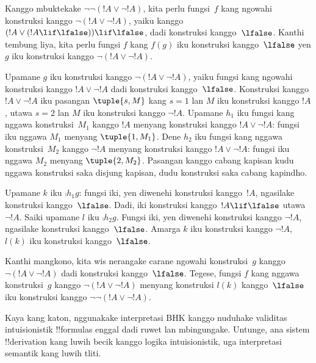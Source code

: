 \documentclass[../../../include/open-logic-section]{subfiles}
\begin{document}
\begin{ex}
Kanggo mbuktekake $\lnot \lnot (!A \lor \lnot !A)$, kita perlu
fungsi~$f$ kang ngowahi konstruksi kanggo $\lnot(!A \lor \lnot !A)$,
yaiku kanggo $(!A
\lor (!A \lif \lfalse)) \lif \lfalse$, dadi konstruksi
kanggo~$\lfalse$. Kanthi tembung liya, kita perlu fungsi $f$ kang
$f(g)$ iku konstruksi kanggo~$\lfalse$ yen $g$ iku konstruksi kanggo
$\lnot(!A
\lor \lnot !A)$.

Upamane $g$ iku konstruksi kanggo $\lnot(!A \lor \lnot !A)$, yaiku
fungsi kang ngowahi konstruksi kanggo $!A \lor \lnot !A$ dadi
konstruksi kanggo~$\lfalse$. Konstruksi kanggo $!A \lor \lnot !A$
iku pasangan $\tuple{s, M}$ kang $s = 1$ lan $M$ iku konstruksi kanggo
$!A$, utawa $s = 2$ lan $M$ iku konstruksi kanggo $\lnot !A$.
Upamane $h_1$ iku fungsi kang nggawa konstruksi~$M_1$ kanggo $!A$
menyang konstruksi kanggo $!A \lor \lnot !A$: fungsi iku nggawa
$M_1$ menyang $\tuple{1, M_1}$. Dene $h_2$ iku fungsi kang nggawa
konstruksi~$M_2$ kanggo $\lnot !A$ menyang konstruksi kanggo
$!A \lor \lnot !A$: fungsi iku nggawa $M_2$ menyang $\tuple{2, M_2}$.
Pasangan kanggo cabang kapisan kudu nggawa konstruksi saka disjung kapisan, dudu konstruksi saka cabang kapindho.

Upamane $k$ iku $\comp{h_1}{g}$: fungsi iki, yen diwenehi konstruksi
kanggo~$!A$, ngasilake konstruksi kanggo~$\lfalse$. Dadi, iki
konstruksi kanggo~$!A \lif \lfalse$ utawa $\lnot !A$. Saiki upamane
$l$ iku $\comp{h_2}{g}$. Fungsi iki, yen diwenehi konstruksi kanggo
$\lnot !A$, ngasilake konstruksi kanggo~$\lfalse$. Amarga $k$ iku
konstruksi kanggo $\lnot !A$, $l(k)$ iku konstruksi kanggo~$\lfalse$.

Kanthi mangkono, kita wis nerangake carane ngowahi konstruksi~$g$
kanggo $\lnot(!A \lor \lnot !A)$ dadi konstruksi kanggo~$\lfalse$.
Tegese, fungsi $f$ kang nggawa konstruksi~$g$ kanggo
$\lnot(!A \lor \lnot !A)$ menyang konstruksi $l(k)$ kanggo~$\lfalse$
iku konstruksi kanggo $\lnot\lnot(!A \lor \lnot !A)$.
\end{ex}

Kaya kang katon, nggunakake interpretasi BHK kanggo nuduhake
validitas intuisionistik !!{formula}s enggal dadi ruwet lan
mbingungake. Untunge, ana sistem !!{derivation} kang luwih becik
kanggo logika intuisionistik, uga interpretasi semantik kang luwih tliti.
\end{document}
